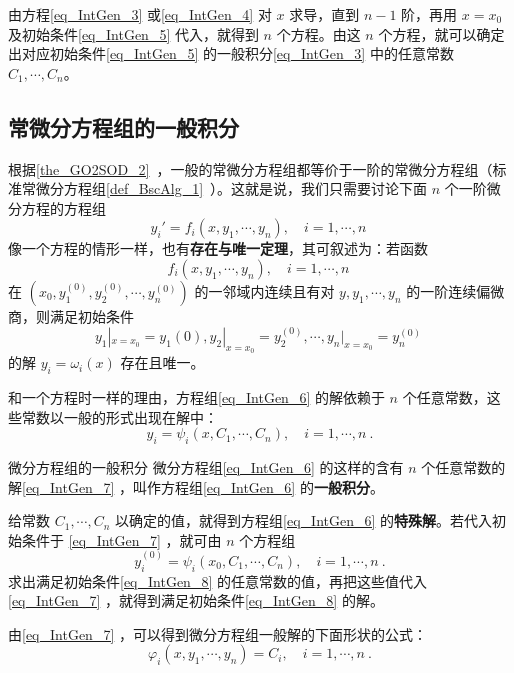 由方程\autoref{eq_IntGen_3} 或\autoref{eq_IntGen_4} 对 $x$ 求导，直到 $n-1$ 阶，再用 $x=x_0$ 及初始条件\autoref{eq_IntGen_5} 代入，就得到 $n$ 个方程。由这 $n$ 个方程，就可以确定出对应初始条件\autoref{eq_IntGen_5} 的一般积分\autoref{eq_IntGen_3} 中的任意常数 $C_1,\cdots,C_n$。
\subsection{常微分方程组的一般积分}
根据\autoref{the_GO2SOD_2}~，一般的常微分方程组都等价于一阶的常微分方程组（标准常微分方程组\autoref{def_BscAlg_1}~）。这就是说，我们只需要讨论下面 $n$ 个一阶微分方程的方程组
\begin{equation}\label{eq_IntGen_6}
y_i'=f_i(x,y_1,\cdots,y_n),\quad i=1,\cdots,n~
\end{equation}
像一个方程的情形一样，也有\textbf{存在与唯一定理}，其可叙述为：若函数
\begin{equation}
f_i(x,y_1,\cdots,y_n),\quad i=1,\cdots,n~
\end{equation}
在 $(x_0,y_1^{(0)},y_2^{(0)},\cdots,y_n^{(0)})$ 的一邻域内连续且有对 $y,y_1,\cdots,y_n$ 的一阶连续偏微商，则满足初始条件
\begin{equation}\label{eq_IntGen_8}
y_1|_{x=x_0}=y_1{(0)},y_2|_{x=x_0}=y_2^{(0)},\cdots,y_n|_{x=x_0}=y_n^{(0)}~
\end{equation}
的解 $y_i=\omega_i(x)$ 存在且唯一。

和一个方程时一样的理由，方程组\autoref{eq_IntGen_6} 的解依赖于 $n$ 个任意常数，这些常数以一般的形式出现在解中：
\begin{equation}\label{eq_IntGen_7}
y_i=\psi_i(x,C_1,\cdots,C_n),\quad i=1,\cdots,n~.
\end{equation}
\begin{definition}{微分方程组的一般积分}
微分方程组\autoref{eq_IntGen_6} 的这样的含有 $n$ 个任意常数的解\autoref{eq_IntGen_7} ，叫作方程组\autoref{eq_IntGen_6} 的\textbf{一般积分}。
\end{definition}
给常数 $C_1,\cdots,C_n$ 以确定的值，就得到方程组\autoref{eq_IntGen_6} 的\textbf{特殊解}。若代入初始条件于 \autoref{eq_IntGen_7} ，就可由 $n$ 个方程组
\begin{equation}
y_i^{(0)}=\psi_i(x_0,C_1,\cdots,C_n),\quad i=1,\cdots,n~.
\end{equation}
求出满足初始条件\autoref{eq_IntGen_8} 的任意常数的值，再把这些值代入\autoref{eq_IntGen_7} ，就得到满足初始条件\autoref{eq_IntGen_8} 的解。

由\autoref{eq_IntGen_7} ，可以得到微分方程组一般解的下面形状的公式：
\begin{equation}\label{eq_IntGen_9}
\varphi_i(x,y_1,\cdots,y_n)=C_i,\quad i=1,\cdots,n~.
\end{equation}

